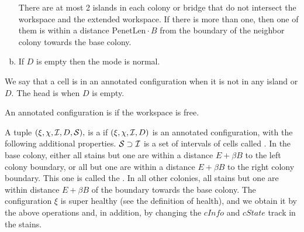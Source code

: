 \documentclass[12pt]{memoir}
\newcommand{\fld}[1]{\ensuremath{\textit{#1}}}
\def\B{B}
\newcommand{\D}{D}
\newcommand{\E}{E}
\newcommand{\PenetrationLen}{\mathrm{PenetLen}}
\newcommand{\cDir}{\fld{cDir}}
\newcommand{\cInfo}{\fld{cInfo}}
\newcommand{\cState}{\fld{cState}}
\begin{document}
\begin{definition}
\begin{enumerate}[(a)]
          There are at most 2 islands in each colony or bridge
            that do not intersect the workspace and the extended
            workspace.
            If there is more than one, then one of them is within
            a distance \( \PenetrationLen\cdot\B \) from the boundary of the neighbor colony
            towards the base colony.

        \item
            If \( \D \) is empty then the mode is normal.
%



    \end{enumerate}



    We say that a cell is  in an annotated configuration
    when it is not in any island or \( \D \).
    The head is  when \( \D \) is empty.

    An  annotated configuration is  if the workspace is free.
\end{definition}

\begin{definition}\label{def:super-annotated}
A tuple \( (\xi,\chi,\cI,\D,\cS), \)
is a  if \( (\xi,\chi,\cI,\D) \) is an annotated configuration, 
with the following additional properties.
\( \mathcal{S} \supset \mathcal{I} \) is a set of intervals of cells called .
In the base colony, either all stains but one are
within a distance \( \E+\beta\B \) to the left colony boundary,
or all but one are within a distance \( \E+\beta\B \)
to the right colony boundary.
This one is called the .
In all other colonies, all stains but one are
within distance \( \E + \beta\B \) of the boundary towards the
base colony.
The configuration \( \xi \) is super healthy (see the definition of health), 
and we obtain it by the above operations and, in addition, by
changing the \( \cInfo \) and \( \cState \) track in the stains.
  
\end{definition}
\end{document}

